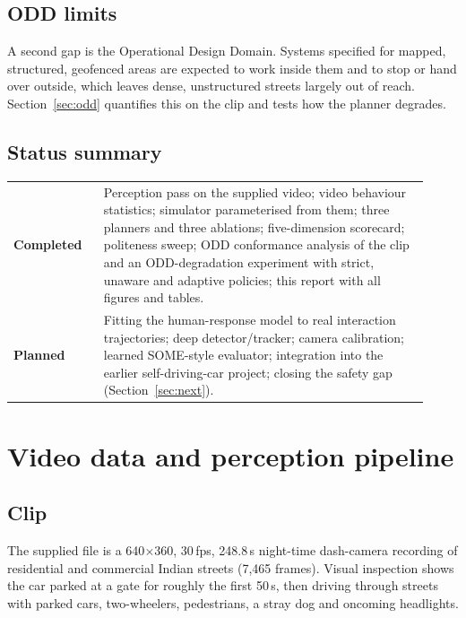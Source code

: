 \documentclass[11pt,a4paper]{article}
\newcommand{\done}{\textcolor{green!45!black}{\textbf{Completed}}}
\newcommand{\planned}{\textcolor{orange!80!black}{\textbf{Planned}}}
\begin{document}
\subsection*{ODD limits}
A second gap is the Operational Design Domain. Systems specified for mapped, structured, geofenced areas are expected to work inside them and to stop or hand over outside, which leaves dense, unstructured streets largely out of reach. Section~\ref{sec:odd} quantifies this on the clip and tests how the planner degrades.

\subsection*{Status summary}
\begin{center}\small
\begin{tabular}{@{}p{0.2\linewidth}p{0.72\linewidth}@{}}
\toprule
\done & Perception pass on the supplied video; video behaviour statistics; simulator parameterised from them; three planners and three ablations; five-dimension scorecard; politeness sweep; ODD conformance analysis of the clip and an ODD-degradation experiment with strict, unaware and adaptive policies; this report with all figures and tables.\\
\planned & Fitting the human-response model to real interaction trajectories; deep detector/tracker; camera calibration; learned SOME-style evaluator; integration into the earlier self-driving-car project; closing the safety gap (Section~\ref{sec:next}).\\
\bottomrule
\end{tabular}
\end{center}

\section{Video data and perception pipeline}
\subsection{Clip}
The supplied file is a 640$\times$360, 30\,fps, 248.8\,s night-time dash-camera recording of residential and commercial Indian streets (7{,}465 frames). Visual inspection shows the car parked at a gate for roughly the first 50\,s, then driving through streets with parked cars, two-wheelers, pedestrians, a stray dog and oncoming headlights.
\end{document}
